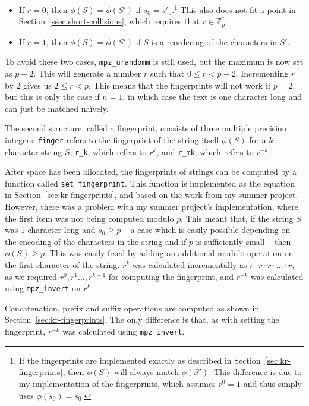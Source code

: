 \documentclass[ %
                    author={Dominic Joseph Moylett},
                    degree={MEng},
                     title={Dictionary Matching with Fingerprints},
                  subtitle={An Empirical Analysis},
                      type={research},
                      year={2015} ]{dissertation}
\begin{document}
\begin{itemize}
  \item If $r = 0$, then $\phi(S) = \phi(S')$ if $s_0 = s'_0$.\footnote{If the fingerprints are implemented exactly as described in Section~\ref{sec:kr-fingerprints}, then $\phi(S)$ will always match $\phi(S')$. This difference is due to my implementation of the fingerprints, which assumes $r^0 = 1$ and thus simply uses $\phi(s_0) = s_0$.} This also does not fit a point in Section~\ref{ssec:short-collisions}, which requires that $r \in \mathbb{Z}^*_p$.
  \item If $r = 1$, then $\phi(S) = \phi(S')$ if $S$ is a reordering of the characters in $S'$.
\end{itemize}

To avoid these two cases, \texttt{mpz\_urandomm} is still used, but the maximum is now set as $p-2$. This will generate a number $r$ such that $0 \leq r < p-2$. Incrementing $r$ by 2 gives us $2 \leq r < p$. This means that the fingerprints will not work if $p = 2$, but this is only the case if $n = 1$, in which case the text is one character long and can just be matched na\"{i}vely.

The second structure, called a fingerprint, consists of three multiple precision integers: \texttt{finger} refers to the fingerprint of the string itself $\phi(S)$ for a $k$ character string $S$, \texttt{r\_k}, which refers to $r^k$, and \texttt{r\_mk}, which refers to $r^{-k}$.

After space has been allocated, the fingerprints of strings can be computed by a function called \texttt{set\_fingerprint}. This function is implemented as the equation in Section~\ref{sec:kr-fingerprints}, and based on the work from my summer project. However, there was a problem with my summer project's implementation, where the first item was not being computed modulo $p$. This meant that, if the string $S$ was 1 character long and $s_0 \geq p$ -- a case which is easily possible depending on the encoding of the characters in the string and if $p$ is sufficiently small -- then $\phi(S) \geq p$. This was easily fixed by adding an additional modulo operation on the first character of the string. $r^k$ was calculated incrementally as $r\cdot r\cdot r\cdot ...\cdot r$, as we required $r^0,r^1...,r^{k-1}$ for computing the fingerprint, and $r^{-k}$ was calculated using \texttt{mpz\_invert} on $r^k$.

Concatenation, prefix and suffix operations are computed as shown in Section~\ref{sec:kr-fingerprints}. The only difference is that, as with setting the fingerprint, $r^{-k}$ was calculated using \texttt{mpz\_invert}.
\end{document}
